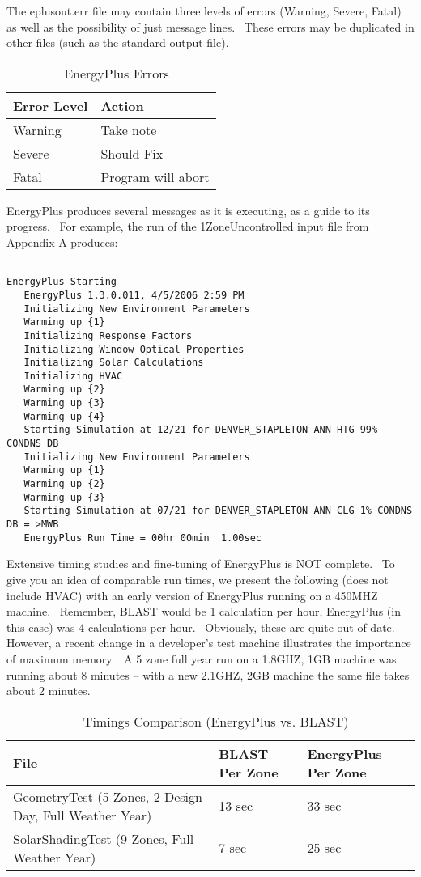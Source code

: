 The eplusout.err file may contain three levels of errors (Warning, Severe, Fatal) as well as the possibility of just message lines.~ These errors may be duplicated in other files (such as the standard output file).

\begin{longtable}[c]{@{}ll@{}}
\caption{  EnergyPlus Errors \protect \label{table:energyplus-errors}}\\
\toprule 
Error Level & Action \tabularnewline \midrule
\endhead
Warning & Take note \tabularnewline
Severe & Should Fix \tabularnewline
Fatal & Program will abort \tabularnewline
\bottomrule
\end{longtable}

EnergyPlus produces several messages as it is executing, as a guide to its progress.~ For example, the run of the 1ZoneUncontrolled input file from Appendix A produces:

\begin{lstlisting}

EnergyPlus Starting
   EnergyPlus 1.3.0.011, 4/5/2006 2:59 PM
   Initializing New Environment Parameters
   Warming up {1}
   Initializing Response Factors
   Initializing Window Optical Properties
   Initializing Solar Calculations
   Initializing HVAC
   Warming up {2}
   Warming up {3}
   Warming up {4}
   Starting Simulation at 12/21 for DENVER_STAPLETON ANN HTG 99% CONDNS DB
   Initializing New Environment Parameters
   Warming up {1}
   Warming up {2}
   Warming up {3}
   Starting Simulation at 07/21 for DENVER_STAPLETON ANN CLG 1% CONDNS DB = >MWB
   EnergyPlus Run Time = 00hr 00min  1.00sec
\end{lstlisting}

Extensive timing studies and fine-tuning of EnergyPlus is NOT complete.~ To give you an idea of comparable run times, we present the following (does not include HVAC) with an early version of EnergyPlus running on a 450MHZ machine.~ Remember, BLAST would be 1 calculation per hour, EnergyPlus (in this case) was 4 calculations per hour.~ Obviously, these are quite out of date.~ However, a recent change in a developer's test machine illustrates the importance of maximum memory.~ A 5 zone full year run on a 1.8GHZ, 1GB machine was running about 8 minutes -- with a new 2.1GHZ, 2GB machine the same file takes about 2 minutes.

\begin{longtable}[c]{p{3.0in}p{1.5in}p{1.5in}}
\caption{  Timings Comparison (EnergyPlus vs. BLAST) \protect \label{table:timings-comparison-energyplus-vs.-blast}}\\
\toprule 
File & BLAST Per Zone & EnergyPlus Per Zone \tabularnewline \midrule
\endhead
GeometryTest (5 Zones, 2 Design Day, Full Weather Year) & 13 sec & 33 sec \tabularnewline
SolarShadingTest (9 Zones, Full Weather Year) & 7 sec & 25 sec \tabularnewline
\bottomrule
\end{longtable}
